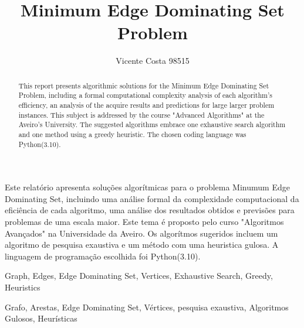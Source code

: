 \documentclass[...]{revdetua}
\begin{document}

\title{Minimum Edge Dominating Set Problem}
\author{Vicente Costa 98515} %
\maketitle

\begin{abstract}%
  This report presents algorithmic solutions for the Minimum Edge Dominating Set Problem, including a formal computational complexity analysis of each algorithm's efficiency, an analysis of the acquire results and predictions for large larger problem instances. This subject is addressed by the course "Advanced Algorithms" at the Aveiro's University. The suggested algorithms embrace one exhaustive search algorithm and one method using a greedy heuristic. The chosen coding language was Python(3.10).
\end{abstract}

\begin{resumo}%
  Este relatório apresenta soluções algorítmicas para o problema Minumum Edge Dominating Set, incluindo uma análise formal da complexidade computacional da eficiência de cada algoritmo, uma análise dos resultados obtidos e previsões para problemas de uma escala maior. Este tema é proposto pelo curso "Algoritmos Avançados" na Universidade da Aveiro. Os algorítmos sugeridos incluem um algoritmo de pesquisa exaustiva e um método com uma heuristica gulosa. A linguagem de programação escolhida foi Python(3.10).
\end{resumo}

\begin{keywords}%
  Graph, Edges, Edge Dominating Set, Vertices, Exhaustive Search, Greedy, Heuristics
\end{keywords}

\begin{palavraschave}%
  Grafo, Arestas, Edge Dominating Set, Vértices, pesquisa exaustiva, Algoritmos Gulosos, Heurísticas
\end{palavraschave}
\end{document}
